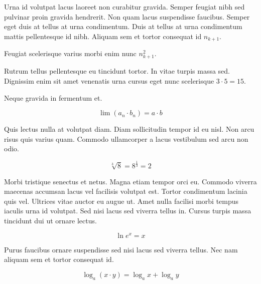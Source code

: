 \documentclass{article}
\begin{document}
	
    Urna id volutpat lacus laoreet non curabitur gravida. Semper feugiat nibh sed pulvinar proin gravida hendrerit. Non quam lacus suspendisse faucibus. Semper eget duis at tellus at urna condimentum. Duis at tellus at urna condimentum mattis pellentesque id nibh. Aliquam sem et tortor consequat id 
    \begin{math}
    n_{k+1}
    \end{math}.
    \newline
    
    Feugiat scelerisque varius morbi enim nunc $ n_{k+1}^2 $.
    \newline
    
    Rutrum tellus pellentesque eu tincidunt tortor. In vitae turpis massa sed. Dignissim enim sit amet venenatis urna cursus eget nunc scelerisque \( 3\cdot5=15 \).
    \newline
    
    Neque gravida in fermentum et. 
    
    \[ \lim\left ( a_n\cdot b_n \right )=a\cdot b  \]
    
    Quis lectus nulla at volutpat diam. Diam sollicitudin tempor id eu nisl. Non arcu risus quis varius quam. Commodo ullamcorper a lacus vestibulum sed arcu non odio.
    
    $$ \sqrt[3]{8}=8^{\frac{1}{3}}=2 $$
    
    Morbi tristique senectus et netus. Magna etiam tempor orci eu. Commodo viverra maecenas accumsan lacus vel facilisis volutpat est. Tortor condimentum lacinia quis vel. Ultrices vitae auctor eu augue ut. Amet nulla facilisi morbi tempus iaculis urna id volutpat. Sed nisi lacus sed viverra tellus in. Cursus turpis massa tincidunt dui ut ornare lectus.
    
    \begin{displaymath}
    	\ln e^x = x
    \end{displaymath}
    
    Purus faucibus ornare suspendisse sed nisi lacus sed viverra tellus. Nec nam aliquam sem et tortor consequat id.
    
    \begin{equation}
    \log _{a}(x\cdot y)=\log _{a}x+\log _{a}y
    \end{equation}
    
\end{document}
